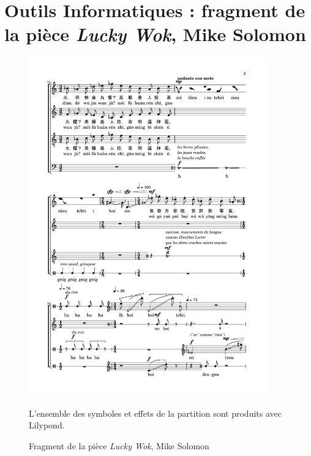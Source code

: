 \section{Outils Informatiques : fragment de la pièce \textit{Lucky Wok}, Mike Solomon}
\label{sec:luckyWokSolomon}
\begin{figure}[H]
	\centering
	\includegraphics[keepaspectratio=true, width=0.92\textwidth]{Annexes/i/lucky.png}
	\caption{Fragment de la pièce \textit{Lucky Wok}, Mike Solomon}
	\medskip
	\small
	L'ensemble des symboles et effets de la partition sont produits avec Lilypond. 	
	\label{fig:luckyWokSolomon}
\end{figure}
